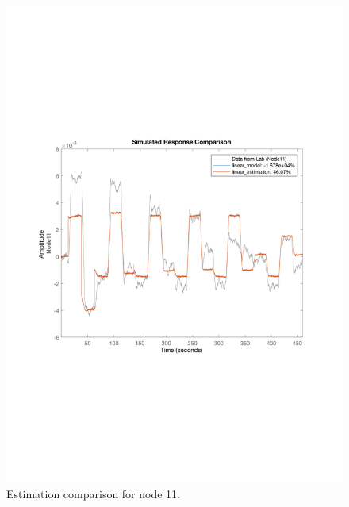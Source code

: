 \begin{figure}[!tbp]
\begin{minipage}[b]{0.45\textwidth}
    \includegraphics[width=\textwidth]{report/pictures/Node11_estimation.pdf}
    \caption{Estimation comparison for node 11.}
  \end{minipage}
\end{figure}

